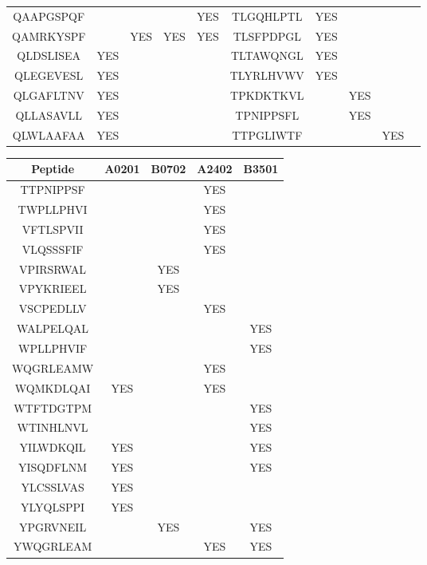 \begin{table}[htp]
\begin{center}
\begin{sideways}
\begin{tabulary}{1.5\textwidth}{|c|c|c|c|c|c|c|c|c|c|}
QAAPGSPQF &  &  &  & YES & TLGQHLPTL & YES &  &  &  \\
QAMRKYSPF &  & YES & YES & YES & TLSFPDPGL & YES &  &  &  \\
QLDSLISEA & YES &  &  &  & TLTAWQNGL & YES &  &  &  \\
QLEGEVESL & YES &  &  &  & TLYRLHVWV & YES &  &  &  \\
QLGAFLTNV & YES &  &  &  & TPKDKTKVL &  & YES &  &  \\
QLLASAVLL & YES &  &  &  & TPNIPPSFL &  & YES &  &  \\
QLWLAAFAA & YES &  &  &  & TTPGLIWTF &  &  & YES & \bigstrut[b] \\
\hline
\end{tabulary}
\end{sideways}
\end{center}
\end{table}


\begin{table}[htp]
\begin{center}
\begin{sideways}
\begin{tabulary}{1.5\textwidth}{|c|c|c|c|c|}
\hline
Peptide & A0201 & B0702 & A2402 & B3501 \bigstrut \\
\hline
TTPNIPPSF &  &  & YES &  \bigstrut[t] \\
TWPLLPHVI &  &  & YES &  \\
VFTLSPVII &  &  & YES &  \\
VLQSSSFIF &  &  & YES &  \\
VPIRSRWAL &  & YES &  &  \\
VPYKRIEEL &  & YES &  &  \\
VSCPEDLLV &  &  & YES &  \\
WALPELQAL &  &  &  & YES \\
WPLLPHVIF &  &  &  & YES \\
WQGRLEAMW &  &  & YES &  \\
WQMKDLQAI & YES &  & YES &  \\
WTFTDGTPM &  &  &  & YES \\
WTINHLNVL &  &  &  & YES \\
YILWDKQIL & YES &  &  & YES \\
YISQDFLNM & YES &  &  & YES \\
YLCSSLVAS & YES &  &  &  \\
YLYQLSPPI & YES &  &  &  \\
YPGRVNEIL &  & YES &  & YES \\
YWQGRLEAM &  &  & YES & YES \bigstrut[b] \\
\hline
\end{tabulary}
\end{sideways}
\end{center}
\end{table}

